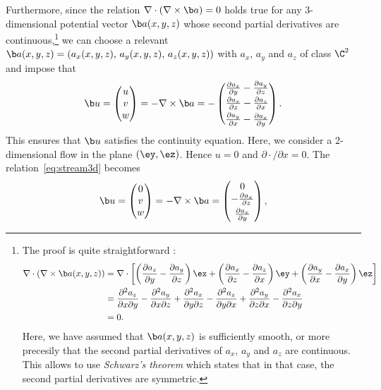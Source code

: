 Furthermore, since the relation $\nabla \cdot (\nabla \times \b a) = 0$ holds true for any 3-dimensional potential vector $\b a(x,y,z)$ whose second partial derivatives are continuous,\footnote{The proof is quite straightforward :
	\begin{align*}
		\nabla \cdot (\nabla \times \b a(x,y,z)) &= \nabla \cdot \left[\left(\frac{\partial a_z}{\partial y}-\frac{\partial a_y}{\partial z}\right)\ex + \left(\frac{\partial a_x}{\partial z}-\frac{\partial a_z}{\partial x}\right)\ey + \left(\frac{\partial a_y}{\partial x}-\frac{\partial a_x}{\partial y}\right)\ez \right]\\
		&= \frac{\partial^2 a_z}{\partial x \partial y} - \frac{\partial^2 a_y}{\partial x \partial z} + \frac{\partial^2 a_x}{\partial y \partial z} - \frac{\partial^2 a_z}{\partial y \partial x} + \frac{\partial^2 a_y}{\partial z \partial x} - \frac{\partial^2 a_x}{\partial z \partial y}\\
		&= 0.  
	\end{align*}
	Here, we have assumed that $\b a(x,y,z)$ is sufficiently smooth, or more precesily that the second partial derivatives of $a_x$, $a_y$ and $a_z$ are continuous. This allows to use \textit{Schwarz's theorem} which states that in that case, the second partial derivatives are symmetric.
} 
we can choose a relevant $\b a(x,y,z) = (a_x(x,y,z),\,a_y(x,y,z),\,a_z(x,y,z))$ with $a_x$, $a_y$ and $a_z$ of class $\C^2$ and impose that 
\begin{equation} \label{eq:stream3d}
	\b u = \begin{pmatrix} u \\ v \\ w \end{pmatrix} = - \nabla \times \b a = - \begin{pmatrix} \frac{\partial a_z}{\partial y}-\frac{\partial a_y}{\partial z}\\[.1 cm]
													\frac{\partial a_x}{\partial z}-\frac{\partial a_z}{\partial x}\\[.1 cm]
													\frac{\partial a_y}{\partial x}-\frac{\partial a_x}{\partial y}
									\end{pmatrix}.
\end{equation}
This ensures that $\b u$ satisfies the continuity equation. Here, we consider a 2-dimensional flow in the plane $(\ey,\ez)$. Hence $u = 0$ and $\partial \cdot/\partial x = 0$. The relation~\eqref{eq:stream3d} becomes 
\begin{equation}
	\b u = \begin{pmatrix} 0 \\ v \\ w \end{pmatrix} = - \nabla \times \b a = \begin{pmatrix} 0\\ - \frac{\partial a_x}{\partial z}\\[.1 cm] \frac{\partial a_x}{\partial y} \end{pmatrix},
\end{equation}
